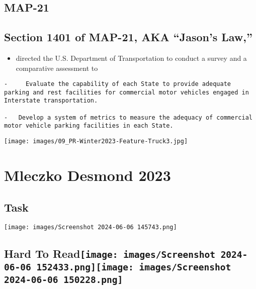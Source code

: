 \documentclass[
  letterpaper,
  DIV=11,
  numbers=noendperiod]{scrartcl}
\providecommand{\tightlist}{%
  \setlength{\itemsep}{0pt}\setlength{\parskip}{0pt}}\usepackage{longtable,booktabs,array}
\begin{document}
\hypertarget{map-21}{%
\subsection{\texorpdfstring{\textbf{MAP-21}}{MAP-21}}\label{map-21}}

\hypertarget{section-1401-of-map-21-aka-jasons-law}{%
\subsection{Section 1401 of MAP-21, AKA ``Jason's
Law,''}\label{section-1401-of-map-21-aka-jasons-law}}

\begin{itemize}
\tightlist
\item
  directed the U.S. Department of Transportation to conduct a survey and
  a comparative assessment to
\end{itemize}

\begin{verbatim}
-     Evaluate the capability of each State to provide adequate parking and rest facilities for commercial motor vehicles engaged in Interstate transportation.

-   Develop a system of metrics to measure the adequacy of commercial motor vehicle parking facilities in each State.
\end{verbatim}

\texttt{[image: images/09\_PR-Winter2023-Feature-Truck3.jpg]}

\hypertarget{mleczko-desmond-2023}{%
\section{Mleczko Desmond 2023}\label{mleczko-desmond-2023}}

\hypertarget{task}{%
\subsection{Task}\label{task}}

\texttt{[image: images/Screenshot 2024-06-06 145743.png]}

\hypertarget{hard-to-read}{%
\subsection[Hard To Read]{\texorpdfstring{Hard To
Read\protect\texttt{[image: images/Screenshot 2024-06-06 152433.png]}\protect\texttt{[image: images/Screenshot 2024-06-06 150228.png]}}{Hard To Read}}\label{hard-to-read}}
\end{document}

